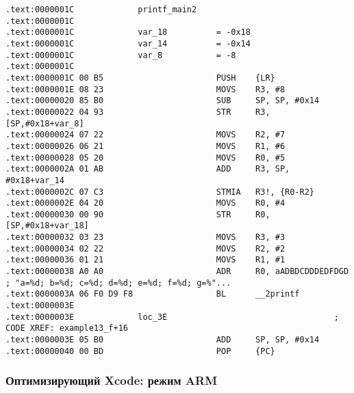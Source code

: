 \begin{lstlisting}
.text:0000001C             printf_main2
.text:0000001C
.text:0000001C             var_18          = -0x18
.text:0000001C             var_14          = -0x14
.text:0000001C             var_8           = -8
.text:0000001C
.text:0000001C 00 B5                       PUSH    {LR}
.text:0000001E 08 23                       MOVS    R3, #8
.text:00000020 85 B0                       SUB     SP, SP, #0x14
.text:00000022 04 93                       STR     R3, [SP,#0x18+var_8]
.text:00000024 07 22                       MOVS    R2, #7
.text:00000026 06 21                       MOVS    R1, #6
.text:00000028 05 20                       MOVS    R0, #5
.text:0000002A 01 AB                       ADD     R3, SP, #0x18+var_14
.text:0000002C 07 C3                       STMIA   R3!, {R0-R2}
.text:0000002E 04 20                       MOVS    R0, #4
.text:00000030 00 90                       STR     R0, [SP,#0x18+var_18]
.text:00000032 03 23                       MOVS    R3, #3
.text:00000034 02 22                       MOVS    R2, #2
.text:00000036 01 21                       MOVS    R1, #1
.text:00000038 A0 A0                       ADR     R0, aADBDCDDDEDFDGD ; "a=%d; b=%d; c=%d; d=%d; e=%d; f=%d; g=%"...
.text:0000003A 06 F0 D9 F8                 BL      __2printf
.text:0000003E
.text:0000003E             loc_3E                                  ; CODE XREF: example13_f+16
.text:0000003E 05 B0                       ADD     SP, SP, #0x14
.text:00000040 00 BD                       POP     {PC}
\end{lstlisting}


\subsubsection{Оптимизирующий Xcode: режим ARM}

